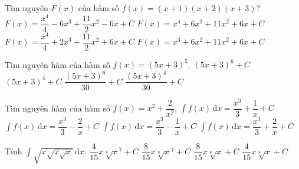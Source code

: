 \begin{ex}%
	Tìm nguyên $F(x)$ của hàm số $f(x)=(x+1)(x+2)(x+3)?$
	\choice
	{$F(x)=\dfrac{x^4}{4}-6x^3+\dfrac{11}{2}x^2-6x+C$}
	{$F(x)=x^4+6x^3+11x^2+6x+C$}
	{\True $F(x)=\dfrac{x^4}{4}+2x^3+\dfrac{11}{2}x^2+6x+C$}
	{$F(x)=x^3+6x^2+11x^2+6x+C$}
\end{ex}

\begin{ex}%
	Tìm nguyên hàm của hàm số $f(x)=(5x+3)^5$.
	\choice
	{$(5x+3)^6+C$}
	{$(5x+3)^4+C$}
	{\True $\dfrac{(5x+3)^6}{30}+C$}
	{$\dfrac{(5x+3)^4}{30}+C$}
\end{ex}

\begin{ex}%
	Tìm nguyên hàm của hàm số $f(x)=x^2+\dfrac{2}{x^2}$.
	\choice
	{\True $\displaystyle\int{f(x)\mathrm{\,d}x}=\dfrac{x^3}{3}+\dfrac{1}{x}+C$}
	{$\displaystyle\int{f(x)\mathrm{\,d}x}=\dfrac{x^3}{3}-\dfrac{2}{x}+C$}
	{$\displaystyle\int{f(x)\mathrm{\,d}x}=\dfrac{x^3}{3}-\dfrac{1}{x}+C$}
	{$\displaystyle\int{f(x)\mathrm{\,d}x}=\dfrac{x^3}{3}+\dfrac{2}{x}+C$}
\end{ex}

\begin{ex}%
	Tính $\displaystyle\int{\sqrt{x\sqrt{x\sqrt{x}}}\mathrm{\,d}x}$.
	\choice
	{$\dfrac{4}{15}x\sqrt[8]x^7+C$}
	{\True $\dfrac{8}{15}x\sqrt[8]x^7+C$}
	{$\dfrac{8}{15}x\sqrt[8]x+C$}
	{$\dfrac{4}{15}x\sqrt[8]x+C$}
\end{ex}

